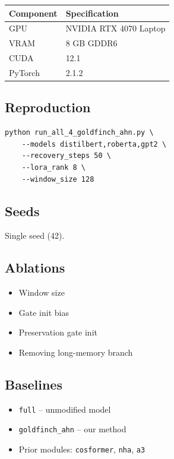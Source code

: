 \begin{table}[H]
\centering
\small
\begin{tabular}{ll}
\toprule
\textbf{Component} & \textbf{Specification} \\
\midrule
GPU & NVIDIA RTX 4070 Laptop \\
VRAM & 8 GB GDDR6 \\
CUDA & 12.1 \\
PyTorch & 2.1.2 \\
\bottomrule
\end{tabular}
\end{table}

\subsection{Reproduction}

\begin{lstlisting}
python run_all_4_goldfinch_ahn.py \
    --models distilbert,roberta,gpt2 \
    --recovery_steps 50 \
    --lora_rank 8 \
    --window_size 128
\end{lstlisting}

\subsection{Seeds}

Single seed (42).

\subsection{Ablations}

\begin{itemize}
\item Window size
\item Gate init bias
\item Preservation gate init
\item Removing long-memory branch

\end{itemize}
\subsection{Baselines}

\begin{itemize}
\item \texttt{full} -- unmodified model
\item \texttt{goldfinch\_ahn} -- our method
\item Prior modules: \texttt{cosformer}, \texttt{nha}, \texttt{a3}

\end{itemize}

